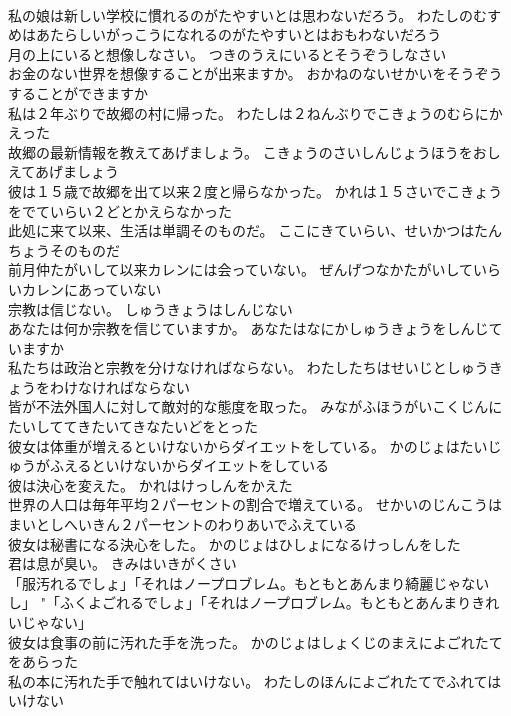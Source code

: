 \documentclass[8pt]{extreport}
\begin{document}
\begin{CJK}{UTF8}{min}
\\	私の娘は新しい学校に慣れるのがたやすいとは思わないだろう。	わたしのむすめはあたらしいがっこうになれるのがたやすいとはおもわないだろう 
\\	月の上にいると想像しなさい。	つきのうえにいるとそうぞうしなさい 
\\	お金のない世界を想像することが出来ますか。	おかねのないせかいをそうぞうすることができますか 
\\	私は２年ぶりで故郷の村に帰った。	わたしは２ねんぶりでこきょうのむらにかえった 
\\	故郷の最新情報を教えてあげましょう。	こきょうのさいしんじょうほうをおしえてあげましょう 
\\	彼は１５歳で故郷を出て以来２度と帰らなかった。	かれは１５さいでこきょうをでていらい２どとかえらなかった 
\\	此処に来て以来、生活は単調そのものだ。	ここにきていらい、せいかつはたんちょうそのものだ 
\\	前月仲たがいして以来カレンには会っていない。	ぜんげつなかたがいしていらいカレンにあっていない 
\\	宗教は信じない。	しゅうきょうはしんじない 
\\	あなたは何か宗教を信じていますか。	あなたはなにかしゅうきょうをしんじていますか 
\\	私たちは政治と宗教を分けなければならない。	わたしたちはせいじとしゅうきょうをわけなければならない 
\\	皆が不法外国人に対して敵対的な態度を取った。	みながふほうがいこくじんにたいしててきたいてきなたいどをとった 
\\	彼女は体重が増えるといけないからダイエットをしている。	かのじょはたいじゅうがふえるといけないからダイエットをしている 
\\	彼は決心を変えた。	かれはけっしんをかえた 
\\	世界の人口は毎年平均２パーセントの割合で増えている。	せかいのじんこうはまいとしへいきん２パーセントのわりあいでふえている 
\\	彼女は秘書になる決心をした。	かのじょはひしょになるけっしんをした 
\\	君は息が臭い。	きみはいきがくさい 
\\	「服汚れるでしょ」「それはノープロブレム。もともとあんまり綺麗じゃないし」	"「ふくよごれるでしょ」「それはノープロブレム。もともとあんまりきれいじゃない」 
\\	彼女は食事の前に汚れた手を洗った。	かのじょはしょくじのまえによごれたてをあらった 
\\	私の本に汚れた手で触れてはいけない。	わたしのほんによごれたてでふれてはいけない 

\end{CJK}
\end{document}
